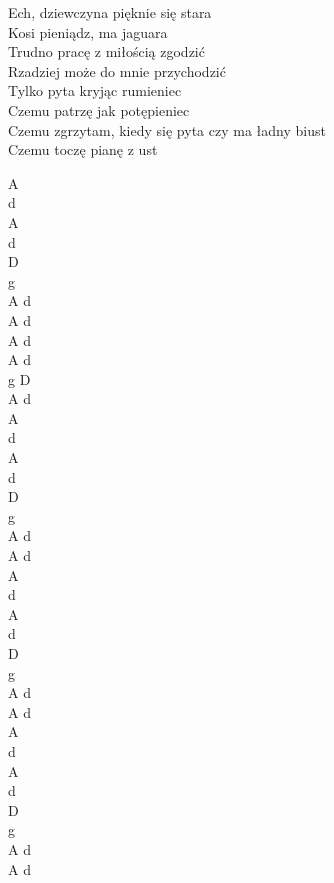 \documentclass[a5paper, 10pt]{book}
\begin{document}
\begin{minipage}[t]{0.8\textwidth}
  Ech, dziewczyna pięknie się stara\\
  Kosi pieniądz, ma jaguara\\
  Trudno pracę z miłością zgodzić\\
  Rzadziej może do mnie przychodzić\\
  Tylko pyta kryjąc rumieniec\\
  Czemu patrzę jak potępieniec\\
  Czemu zgrzytam, kiedy się pyta czy ma ładny biust\\
  Czemu toczę pianę z ust\\
\end{minipage}
\begin{minipage}[t]{0.2\textwidth}
  A\\
  d\\
  A\\
  d\\
  D\\
  g\\
  A d\\
  A d\\

  A d\\
  A d\\
  g D\\
  A d\\

  A\\
  d\\
  A\\
  d\\
  D\\
  g\\
  A d\\
  A d\\

  A\\
  d\\
  A\\
  d\\
  D\\
  g\\
  A d\\
  A d\\

  A\\
  d\\
  A\\
  d\\
  D\\
  g\\
  A d\\
  A d\\

\end{minipage}
\end{document}
